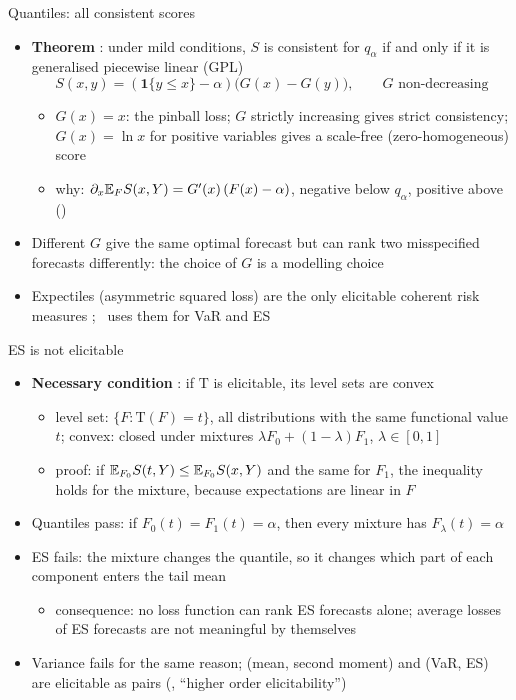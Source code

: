 \begin{frame}{Quantiles: all consistent scores}
\itemsize{\small}
\begin{itemize}
    \item \textbf{Theorem} : under mild conditions, $S$ is consistent for $q_\alpha$ if and only if it is generalised piecewise linear (GPL)
    \[ S(x, y) = (\mathbf 1\{y \le x\} - \alpha)\big(G(x) - G(y)\big), \qquad G \text{ non-decreasing} \]
    \begin{itemize}
        \item $G(x) = x$: the pinball loss; $G$ strictly increasing gives strict consistency; $G(x) = \ln x$ for positive variables gives a scale-free (zero-homogeneous) score
        \item why: $\partial_x\mathbb{E}_F S(x, Y) = G'(x)\,(F(x) - \alpha)$, negative below $q_\alpha$, positive above ()
    \end{itemize}
    \item Different $G$ give the same optimal forecast but can rank two misspecified forecasts differently: the choice of $G$ is a modelling choice
    \item Expectiles (asymmetric squared loss) are the only elicitable coherent risk measures ; \ uses them for VaR and ES
\end{itemize}
\end{frame}

\begin{frame}{ES is not elicitable}
\itemsize{\small}
\begin{itemize}
    \item \textbf{Necessary condition} : if $\mathrm T$ is elicitable, its level sets are convex
    \begin{itemize}
        \item level set: $\{F: \mathrm T(F) = t\}$, all distributions with the same functional value $t$; convex: closed under mixtures $\lambda F_0 + (1 - \lambda)F_1$, $\lambda \in [0, 1]$
        \item proof: if $\mathbb{E}_{F_0}S(t, Y) \le \mathbb{E}_{F_0}S(x, Y)$ and the same for $F_1$, the inequality holds for the mixture, because expectations are linear in $F$
    \end{itemize}
    \item Quantiles pass: if $F_0(t) = F_1(t) = \alpha$, then every mixture has $F_\lambda(t) = \alpha$
    \item ES fails: the mixture changes the quantile, so it changes which part of each component enters the tail mean 
    \begin{itemize}
        \item consequence: no loss function can rank ES forecasts alone; average losses of ES forecasts are not meaningful by themselves
    \end{itemize}
    \item Variance fails for the same reason; (mean, second moment) and (VaR, ES) are elicitable as pairs (, ``higher order elicitability'')
\end{itemize}
\end{frame}

